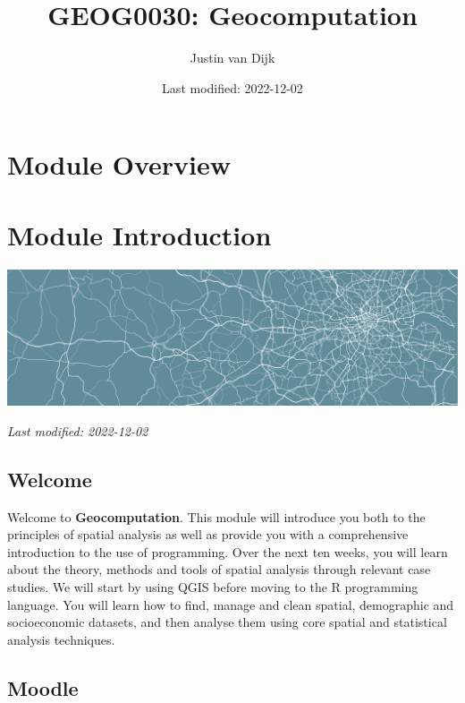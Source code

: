 \documentclass[
]{book}
\title{GEOG0030: Geocomputation}
\author{Justin van Dijk}
\date{Last modified: 2022-12-02}
\begin{document}
\maketitle

{
\setcounter{tocdepth}{1}
\tableofcontents
}
\hypertarget{module-overview}{%
\chapter*{Module Overview}\label{module-overview}}

\hypertarget{module-introduction}{%
\chapter*{Module Introduction}\label{module-introduction}}

\begin{center}\includegraphics[width=1\linewidth]{images/general/geocomputation_welcome} \end{center}

\emph{Last modified: 2022-12-02}

\hypertarget{welcome}{%
\section*{Welcome}\label{welcome}}

Welcome to \textbf{Geocomputation}. This module will introduce you both to the principles of spatial analysis as well as provide you with a comprehensive introduction to the use of programming. Over the next ten weeks, you will learn about the theory, methods and tools of spatial analysis through relevant case studies. We will start by using QGIS before moving to the R programming language. You will learn how to find, manage and clean spatial, demographic and socioeconomic datasets, and then analyse them using core spatial and statistical analysis techniques.

\hypertarget{moodle}{%
\section*{Moodle}\label{moodle}}
\end{document}
